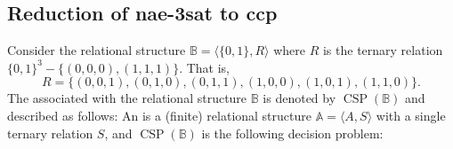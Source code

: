 \documentclass[12pt]{amsart}
\numberwithin{equation}{section}
\theoremstyle{plain}
\theoremstyle{definition}
\newcommand{\ccp}{\acs{ccp}\xspace}
\newcommand{\sat}{\acs{sat}\xspace}
\newcommand{\nae}{\acs{nae}\xspace}
\newcommand{\NP}{\acs{NP}\xspace}
\begin{document}




\subsection{Reduction of \nae-3\sat to \ccp}
Consider the relational structure $\mathbb B = \langle \{0, 1\}, R\rangle$
where $R$ is the ternary relation $\{0, 1\}^3 - \{(0,0,0), (1,1,1)\}$.
That is,
\[ R = \{(0,0,1), (0,1,0), (0,1,1), (1,0,0), (1,0,1), (1,1,0)\}.\]
The \csp associated with the relational structure $\mathbb B$
is denoted by $\operatorname{CSP}(\mathbb B)$ and described as follows:
An  %
is a (finite) relational structure $\mathbb A = \langle A, S \rangle$
with a single ternary relation $S$, and $\operatorname{CSP}(\mathbb B)$ is the
following decision problem:
\end{document}
